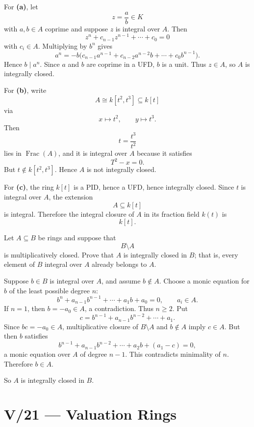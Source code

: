 \begin{solution}
For \textbf{(a)}, let
\[
z=\frac ab\in K
\]
with \(a,b\in A\) coprime and suppose \(z\) is integral over \(A\). Then
\[
z^n+c_{n-1}z^{n-1}+\cdots+c_0=0
\]
with \(c_i\in A\). Multiplying by \(b^n\) gives
\[
a^n
=
-b\bigl(c_{n-1}a^{n-1}+c_{n-2}a^{n-2}b+\cdots+c_0b^{n-1}\bigr).
\]
Hence \(b\mid a^n\). Since \(a\) and \(b\) are coprime in a UFD, \(b\) is a
unit. Thus \(z\in A\), so \(A\) is integrally closed.

For \textbf{(b)}, write
\[
A\cong k[t^2,t^3]\subseteq k[t]
\]
via
\[
x\mapsto t^2,\qquad y\mapsto t^3.
\]
Then
\[
t=\frac{t^3}{t^2}
\]
lies in \(\operatorname{Frac}(A)\), and it is integral over \(A\) because it
satisfies
\[
T^2-x=0.
\]
But \(t\notin k[t^2,t^3]\). Hence \(A\) is not integrally closed.

For \textbf{(c)}, the ring \(k[t]\) is a PID, hence a UFD, hence integrally
closed. Since \(t\) is integral over \(A\), the extension
\[
A\subseteq k[t]
\]
is integral. Therefore the integral closure of \(A\) in its fraction field
\(k(t)\) is
\[
\boxed{k[t]}.
\]
\end{solution}


\begin{problem}[CP-V-0034]
\label{prob:cp-v-0034}
Let \(A\subseteq B\) be rings and suppose that
\[
B\setminus A
\]
is multiplicatively closed. Prove that \(A\) is integrally closed in \(B\);
that is, every element of \(B\) integral over \(A\) already belongs to \(A\).
\end{problem}

\begin{solution}
Suppose \(b\in B\) is integral over \(A\), and assume \(b\notin A\).
Choose a monic equation for \(b\) of the least possible degree \(n\):
\[
b^n+a_{n-1}b^{n-1}+\cdots+a_1b+a_0=0,
\qquad a_i\in A.
\]
If \(n=1\), then \(b=-a_0\in A\), a contradiction. Thus \(n\ge2\).
Put
\[
c=b^{n-1}+a_{n-1}b^{n-2}+\cdots+a_1.
\]
Since \(bc=-a_0\in A\), multiplicative closure of \(B\setminus A\)
and \(b\notin A\) imply \(c\in A\). But then \(b\) satisfies
\[
b^{n-1}+a_{n-1}b^{n-2}+\cdots+a_2b+(a_1-c)=0,
\]
a monic equation over \(A\) of degree \(n-1\). This contradicts
minimality of \(n\). Therefore \(b\in A\).

So \(A\) is integrally closed in \(B\).
\end{solution}



\section*{V/21 --- Valuation Rings}

